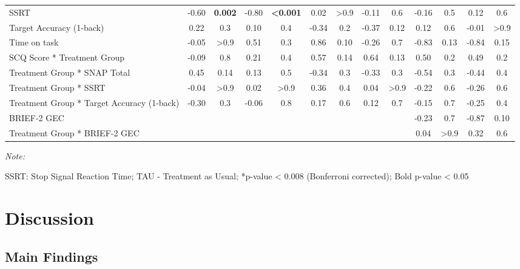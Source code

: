 \documentclass[
  letterpaper,
]{ut-thesis}
\begin{document}
\begin{landscape}
\begin{table}
{\begin{threeparttable}
{\begin{tabular}{lcccccccccccc}
SSRT & -0.60 & \textbf{0.002} & -0.80 & \textbf{<0.001} & 0.02 & >0.9 & -0.11 & 0.6 & -0.16 & 0.5 & 0.12 & 0.6\\
Target Accuracy (1-back) & 0.22 & 0.3 & 0.10 & 0.4 & -0.34 & 0.2 & -0.37 & 0.12 & 0.12 & 0.6 & -0.01 & >0.9\\
Time on task & -0.05 & >0.9 & 0.51 & 0.3 & 0.86 & 0.10 & -0.26 & 0.7 & -0.83 & 0.13 & -0.84 & 0.15\\
SCQ Score * Treatment Group & -0.09 & 0.8 & 0.21 & 0.4 & 0.57 & 0.14 & 0.64 & 0.13 & 0.50 & 0.2 & 0.49 & 0.2\\
Treatment Group * SNAP Total & 0.45 & 0.14 & 0.13 & 0.5 & -0.34 & 0.3 & -0.33 & 0.3 & -0.54 & 0.3 & -0.44 & 0.4\\
Treatment Group * SSRT & -0.04 & >0.9 & 0.02 & >0.9 & 0.36 & 0.4 & 0.04 & >0.9 & -0.22 & 0.6 & -0.26 & 0.6\\
Treatment Group * Target Accuracy (1-back) & -0.30 & 0.3 & -0.06 & 0.8 & 0.17 & 0.6 & 0.12 & 0.7 & -0.15 & 0.7 & -0.25 & 0.4\\
BRIEF-2 GEC &  &  &  &  &  &  &  &  & -0.23 & 0.7 & -0.87 & 0.10\\
Treatment Group * BRIEF-2 GEC &  &  &  &  &  &  &  &  & 0.04 & >0.9 & 0.32 & 0.6\\
\bottomrule
\end{tabular}}
\begin{tablenotes}[para]
\item \textit{Note: } 
\item SSRT: Stop Signal Reaction Time; TAU - Treatment as Usual; *p-value < 0.008 (Bonferroni corrected); Bold p-value < 0.05
\end{tablenotes}
\end{threeparttable}

}

\end{table}%

\end{landscape}


\chapter{Discussion}\label{discussion}

\section{Main Findings}\label{main-findings}
\end{document}
